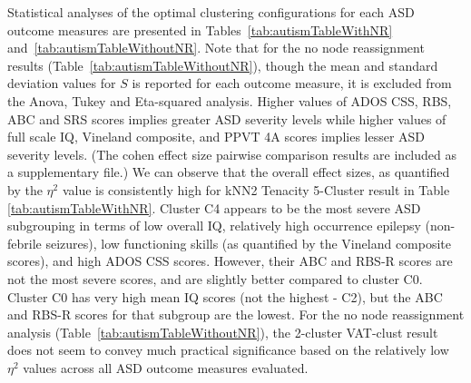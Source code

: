 \documentclass{bmcart}
\begin{document}
\begin{table}[t]
  \caption{Demographics per cluster configuration without node reassignment. }
  \label{tab:demoWithoutNodeReassignment}
  \centering
\end{table} 



Statistical analyses of the optimal clustering configurations for each ASD outcome measures are presented in Tables~\ref{tab:autismTableWithNR} and~\ref{tab:autismTableWithoutNR}. Note that for the no node reassignment results (Table~\ref{tab:autismTableWithoutNR}), though the mean and standard deviation values for $S$ is reported for each outcome measure, it is excluded from the Anova, Tukey and Eta-squared analysis. Higher values of ADOS CSS, RBS, ABC and SRS scores implies greater ASD severity levels while higher values of full scale IQ, Vineland composite, and PPVT 4A scores implies lesser ASD severity levels. (The cohen effect size pairwise comparison results are included as a supplementary file.)
We can observe that the overall effect sizes, as quantified by the $\eta^2$ value is consistently high for  kNN2 Tenacity 5-Cluster result in Table \ref{tab:autismTableWithNR}. Cluster C4 appears to be the most severe ASD subgrouping in terms of low overall IQ, relatively high occurrence epilepsy (non-febrile seizures), low functioning skills (as quantified by the Vineland composite scores), and high ADOS CSS scores. However, their ABC and RBS-R scores are not the most severe scores, and are slightly better compared to cluster C0. Cluster C0 has very high mean IQ scores (not the highest - C2), but the ABC and RBS-R scores for that subgroup are the lowest. %
For the no node reassignment analysis (Table~\ref{tab:autismTableWithoutNR}), the 2-cluster VAT-clust result does not seem to convey much practical significance based on the relatively low $\eta^2$ values across all ASD outcome measures evaluated.
\end{document}
